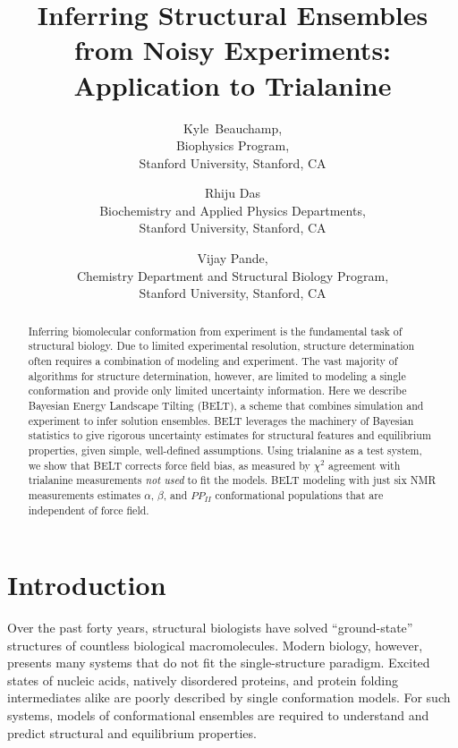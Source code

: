 \documentclass[11pt,titlepage]{article}
\author{Kyle~Beauchamp, \\
Biophysics Program, \\
Stanford University, Stanford, CA
\and Rhiju Das \\
Biochemistry and Applied Physics Departments, \\
Stanford University, Stanford, CA
\and Vijay Pande, \\
Chemistry Department and Structural Biology Program, \\
Stanford University, Stanford, CA
}
\title{Inferring Structural Ensembles from Noisy Experiments: Application to Trialanine}
\begin{document}
\maketitle

\begin{abstract}

Inferring biomolecular conformation from experiment is the fundamental task of structural biology.  Due to limited experimental resolution, structure determination often requires a combination of modeling and experiment.  The vast majority of algorithms for structure determination, however, are limited to modeling a single conformation and provide only limited uncertainty information.  Here we describe Bayesian Energy Landscape Tilting (BELT), a scheme that combines simulation and experiment to infer solution ensembles.  BELT leverages the machinery of Bayesian statistics to give rigorous uncertainty estimates for structural features and equilibrium properties, given simple, well-defined assumptions.  Using trialanine as a test system, we show that BELT corrects force field bias, as measured by $\chi^2$ agreement with trialanine measurements \emph{not used} to fit the models.  BELT modeling with just six NMR measurements estimates $\alpha$, $\beta$, and $PP_{II}$ conformational populations that are 
independent of force field.  

\end{abstract}

\section*{Introduction}

Over the past forty years, structural biologists have solved ``ground-state'' structures of countless biological macromolecules\citep{Berman2000}. Modern biology, however, presents many systems that do not fit the single-structure paradigm.  Excited states of nucleic acids\citep{dethoff2012}, natively disordered proteins\citep{fink2005}, and protein folding intermediates\citep{korzhnev2004} alike are poorly described by single conformation models.  For such systems, models of conformational ensembles are required to understand and predict structural and equilibrium properties.  
\end{document}
